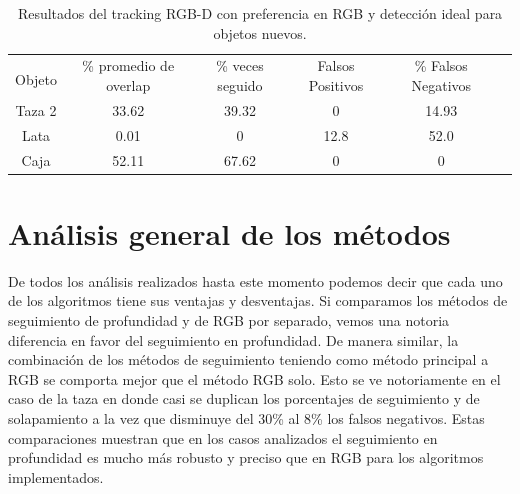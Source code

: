 \begin{table}[h]
	\centering
    \begin{tabular}{|c|c|c|c|c|c|}
    \hline
    & \multirow{2}{2.4cm}{\% promedio de overlap} & \multirow{2}{2cm}{\% veces seguido} & \multirow{2}{1.6cm}{Falsos Positivos} & \multirow{2}{1.6cm}{\% Falsos Negativos}\\
	Objeto & & & &\\
    \hline
    Taza 2  & 33.62      & 39.32      & 0       & 14.93\\
    \hline
    Lata    &  0.01      &     0      & 12.8    &  52.0\\
    \hline
    Caja    & 52.11      & 67.62      & 0       &     0\\
    \hline
    \end{tabular}
\caption{Resultados del tracking RGB-D con preferencia en RGB y detección ideal para objetos nuevos.}
\label{tabla_rgbd_rgb_nuevos}
\end{table}


\section{Análisis general de los métodos}
%
%
%
%
%

De todos los análisis realizados hasta este momento podemos decir que cada uno de los algoritmos tiene sus ventajas y desventajas. Si comparamos los métodos de seguimiento de profundidad y de RGB por separado, vemos una notoria diferencia en favor del seguimiento en profundidad. De manera similar, la combinación de los métodos de seguimiento teniendo como método principal a RGB se comporta mejor que el método RGB solo. Esto se ve notoriamente en el caso de la taza en donde casi se duplican los porcentajes de seguimiento y de solapamiento a la vez que disminuye del 30\% al 8\% los falsos negativos. Estas comparaciones muestran que en los casos analizados el seguimiento en profundidad es mucho más robusto y preciso que en RGB para los algoritmos implementados.

